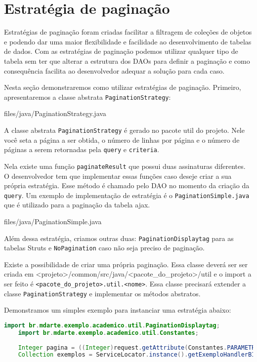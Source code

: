 \section{Estratégia de paginação}

Estratégias de paginação foram criadas facilitar a filtragem de coleções de objetos e podendo dar uma maior flexibilidade e facilidade ao desenvolvimento de tabelas de dados. Com as estratégias de paginação podemos utilizar qualquer tipo de tabela sem ter que alterar a estrutura dos DAOs para definir a paginação e como consequência facilita ao desenvolvedor adequar a solução para cada caso.

Nesta seção demonstraremos como utilizar estratégias de paginação. Primeiro, apresentaremos a classe abstrata \texttt{PaginationStrategy}:

 {files/java/PaginationStrategy.java}

A classe abstrata \texttt{PaginationStrategy} é gerado no pacote util do projeto. Nele você seta a página a ser obtida,  o número de linhas por página e o número de páginas a serem retornadas pela \texttt{query} e
\texttt{criteria}.

Nela existe uma função \texttt{paginateResult} que possui duas assinaturas diferentes. O desenvolvedor tem que implementar essas funções caso deseje criar a sua própria estratégia. Esse método é chamado pelo DAO no momento da criação da \texttt{query}. Um exemplo de implementação de estratégia é o \texttt{PaginationSimple.java} que é utilizado para a paginação da tabela ajax.

 {files/java/PaginationSimple.java}

Além dessa estratégia, criamos outras duas: \texttt{PaginationDisplaytag} para as tabelas Struts e \texttt{NoPagination} caso não seja preciso de paginação.

Existe a possibilidade de criar uma própria paginação. Essa classe deverá ser ser criada em <projeto>/common/src/java/<pacote\_do\_projeto>/util e o import a ser feito é \texttt{<pacote\_do\_projeto>.util.<nome>}. Essa classe precisará extender a classe \texttt{PaginationStrategy} e implementar os métodos abstratos.

Demonstramos um simples exemplo para instanciar uma estratégia abaixo:

\begin{lstlisting}[language=java, frame=single, breaklines=true]
	import br.mdarte.exemplo.academico.util.PaginationDisplaytag;
	import br.mdarte.exemplo.academico.util.Constantes;
	
	Integer pagina = ((Integer)request.getAttribute(Constantes.PARAMETRO_PAGINA)); //Struts 1
	Collection exemplos = ServiceLocator.instance().getExemploHandlerBI().recuperaExemplos(new PaginationDisplaytag(paginacao));
\end{lstlisting}